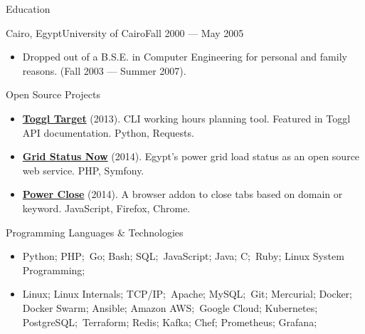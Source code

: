 \documentclass[]{mosabcv}
\begin{document}
\begin{cvsection}{Education}
  \begin{cvsubsection}{Cairo, Egypt}{University of Cairo}{Fall 2000 --- May
    2005}
    \begin{itemize}
      \item Dropped out of a B.S.E. in Computer Engineering for personal and
        family reasons. (Fall 2003 --- Summer 2007).
    \end{itemize}
  \end{cvsubsection}
\end{cvsection}

\begin{cvsection}{Open Source Projects}
  \begin{cvsubsection}{}{}{}
    \begin{itemize}
      \item \textbf{\href{https://github.com/mos3abof/toggl_target}{Toggl
        Target}} (2013). CLI working hours planning tool. Featured in Toggl API
        documentation. Python, Requests.
      \item \textbf{\href{https://www.gridstatusnow.com}{Grid Status Now}}
        (2014). Egypt's power grid load status as an open source web service.
        PHP, Symfony.
      \item \textbf{\href{https://power-close.com/}{Power Close}} (2014). A
        browser addon to close tabs based on domain or keyword. JavaScript,
        Firefox, Chrome.
    \end{itemize}
  \end{cvsubsection}
\end{cvsection}

\begin{cvsection}{Programming Languages \& Technologies}
  \begin{cvsubsection}{}{}{}
    \begin{itemize}
      \item Python; PHP;\ Go; Bash; SQL;\ JavaScript; Java; C;\  Ruby;
        Linux System Programming;
      \item Linux; Linux Internals; TCP/IP;\ Apache; MySQL;\ Git; Mercurial;
        Docker; Docker Swarm; Ansible; Amazon AWS;\ Google Cloud; Kubernetes;
        PostgreSQL;\ Terraform; Redis; Kafka; Chef; Prometheus; Grafana;
    \end{itemize}
  \end{cvsubsection}
\end{cvsection}
\end{document}
